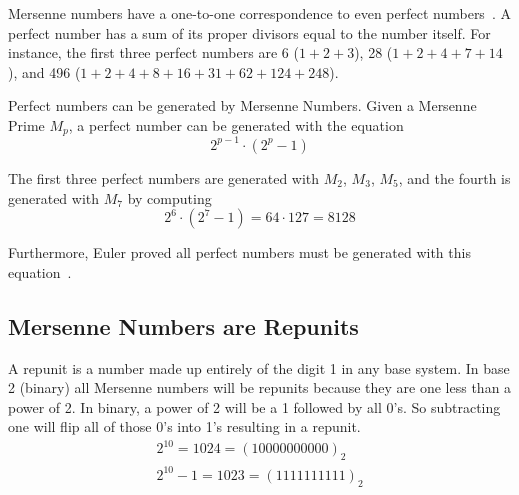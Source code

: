 Mersenne numbers have a one-to-one correspondence to even perfect numbers~\cite{perfect}. A perfect number has
a sum of its proper divisors equal to the number itself. For instance, the first three perfect numbers
are 6 ($1 + 2 + 3$), 28 ($1 + 2 + 4 + 7 + 14$), and 496 ($1 + 2 + 4 + 8 + 16 + 31 + 62 + 124 + 248$).

Perfect numbers can be generated by Mersenne Numbers. Given a Mersenne Prime $M_p$, a perfect number can be
generated with the equation
\begin{equation}
\label{eqn:perfno}
2^{p-1}\cdot(2^p-1)
\end{equation}

The first three perfect numbers are generated with $M_2$, $M_3$, $M_5$, and the fourth is generated with $M_7$ by computing 
\[ 2^6\cdot(2^7-1) = 64\cdot127 = 8128 \]

Furthermore, Euler proved all perfect numbers must be generated with this equation~\cite{perfect}.

\subsection{Mersenne Numbers are Repunits}
A repunit is a number made up entirely of the digit 1 in any base system.  In base 2 (binary) all Mersenne numbers will be repunits because they are one less than a power of 2.  In binary, a power of 2 will be a 1 followed by all 0's.  So subtracting one will flip all of those 0's into 1's resulting in a repunit.
\begin{align*}
2^{10} = 1024 = (10000000000)_2\\
2^{10} - 1 = 1023 = (1111111111)_2
\end{align*}
